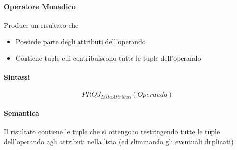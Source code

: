 \documentclass[../main.tex]{subfiles}
\begin{document}
	\paragraph{Operatore Monadico}
	Produce un risultato che 
	\begin{itemize}
		\item Possiede parte degli attributi dell'operando
		\item Contiene tuple cui contribuiscono tutte le tuple dell'operando
	\end{itemize}
	\paragraph{Sintassi}
	\[PROJ_{ListaAttributi}(Operando)\]
	\paragraph{Semantica}
	Il risultato contiene le tuple che si ottengono restringendo tutte le tuple dell'operando agli attributi nella lista (ed eliminando gli eventuali duplicati)
\end{document}
